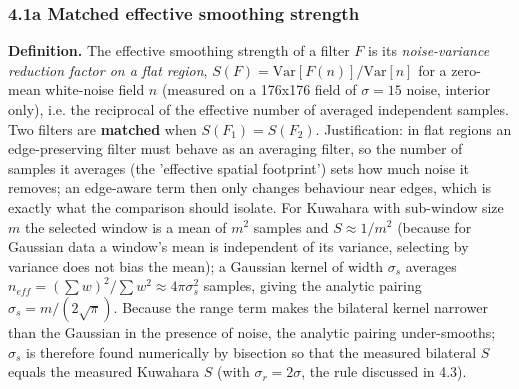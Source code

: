 \documentclass[10pt,a4paper]{article}
\begin{document}
\subsubsection{4.1a Matched effective smoothing strength}
\textbf{Definition.} The effective smoothing strength of a filter $F$ is its \textit{noise-variance reduction factor on a flat region}, $S(F)=\mathrm{Var}[F(n)]/\mathrm{Var}[n]$ for a zero-mean white-noise field $n$ (measured on a 176x176 field of $\sigma=15$ noise, interior only), i.e. the reciprocal of the effective number of averaged independent samples. Two filters are \textbf{matched} when $S(F_1)=S(F_2)$. Justification: in flat regions an edge-preserving filter must behave as an averaging filter, so the number of samples it averages (the 'effective spatial footprint') sets how much noise it removes; an edge-aware term then only changes behaviour near edges, which is exactly what the comparison should isolate. For Kuwahara with sub-window size $m$ the selected window is a mean of $m^2$ samples and $S\approx1/m^2$ (because for Gaussian data a window's mean is independent of its variance, selecting by variance does not bias the mean); a Gaussian kernel of width $\sigma_s$ averages $n_{eff}=(\sum w)^2/\sum w^2\approx4\pi\sigma_s^2$ samples, giving the analytic pairing $\sigma_s=m/(2\sqrt\pi)$. Because the range term makes the bilateral kernel narrower than the Gaussian in the presence of noise, the analytic pairing under-smooths; $\sigma_s$ is therefore found numerically by bisection so that the measured bilateral $S$ equals the measured Kuwahara $S$ (with $\sigma_r=2\sigma$, the rule discussed in 4.3).
\end{document}
